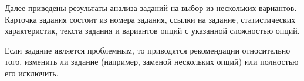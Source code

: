 Далее приведены результаты анализа заданий на выбор из нескольких вариантов. Карточка задания состоит из номера задания, ссылки на задание, статистических характеристик, текста задания и вариантов опций с указанной сложностью опций.

Если задание является проблемным, то приводятся рекомендации относительно того, изменить ли задание (например, заменой нескольких опций) или полностью его исключить.